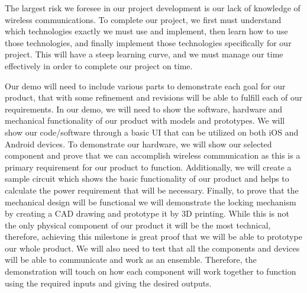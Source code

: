 \documentclass{article}
\begin{document}
The largest risk we foresee in our project development is our lack of knowledge of wireless communications. To complete our project, we first must understand which technologies exactly we must use and implement, then learn how to use those technologies, and finally implement those technologies specifically for our project.  This will have a steep learning curve, and we must manage our time effectively in order to complete our project on time. 

Our demo will need to include various parts to demonstrate each goal for our product, that with some refinement and revisions will be able to fulfill each of our requirements. In our demo, we will need to show the software, hardware and mechanical functionality of our product with models and prototypes.  We will show our code/software through a basic UI that can be utilized on both iOS and Android devices.  To demonstrate our hardware, we will show our selected component and prove that we can accomplish wireless communication as this is a primary requirement for our product to function.  Additionally, we will create a sample circuit which shows the basic functionality of our product and helps to calculate the power requirement that will be necessary.  Finally, to prove that the mechanical design will be functional we will demonstrate the locking mechanism by creating a CAD drawing and prototype it by 3D printing.  While this is not the only physical component of our product it will be the most technical, therefore, achieving this milestone is great proof that we will be able to prototype our whole product.  We will also need to test that all the components and devices will be able to communicate and work as an ensemble.  Therefore, the demonstration will touch on how each component will work together to function using the required inputs and giving the desired outputs.



\end{document}

